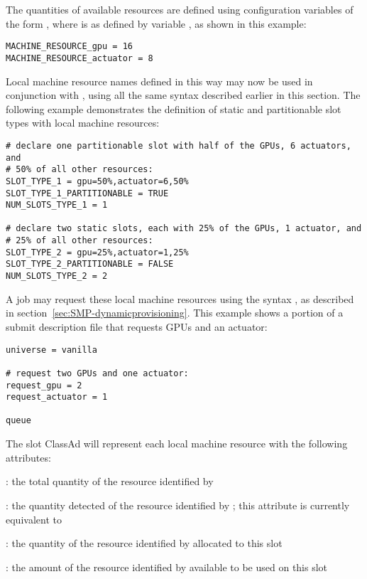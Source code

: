 \begin{description}
The quantities of available resources are defined using configuration
variables of the form ,
where  is as defined by variable 
, as shown in this example:
\begin{verbatim}
MACHINE_RESOURCE_gpu = 16
MACHINE_RESOURCE_actuator = 8
\end{verbatim}

Local machine resource names defined in this way may now be used in conjunction 
with , using all the same syntax described
earlier in this section.
The following example demonstrates
the definition of static and partitionable slot types with local machine 
resources:
\begin{verbatim}
# declare one partitionable slot with half of the GPUs, 6 actuators, and
# 50% of all other resources:
SLOT_TYPE_1 = gpu=50%,actuator=6,50%
SLOT_TYPE_1_PARTITIONABLE = TRUE
NUM_SLOTS_TYPE_1 = 1

# declare two static slots, each with 25% of the GPUs, 1 actuator, and
# 25% of all other resources: 
SLOT_TYPE_2 = gpu=25%,actuator=1,25%
SLOT_TYPE_2_PARTITIONABLE = FALSE
NUM_SLOTS_TYPE_2 = 2
\end{verbatim}

A job may request these local machine resources using the 
syntax , 
as described in section~\ref{sec:SMP-dynamicprovisioning}.  
This example shows a portion of a submit description file 
that requests GPUs and an actuator:
\begin{verbatim}
universe = vanilla

# request two GPUs and one actuator:
request_gpu = 2
request_actuator = 1

queue
\end{verbatim}

The slot ClassAd will represent each local machine resource
with the following attributes:
\begin{description}
\item{: the total quantity of the resource 
  identified by }
\item{: the quantity detected of the resource
  identified by ; this attribute is
  currently equivalent to }
\item{: the quantity of the resource
  identified by  allocated to this slot}
\item{: the amount of the resource
  identified by  available to be used on this slot}
\end{description}


\end{description}
